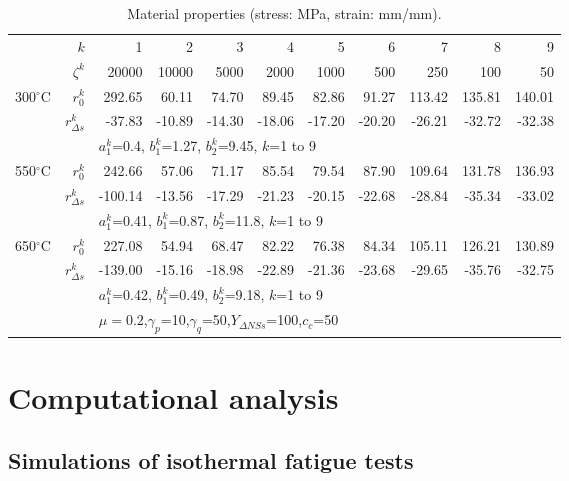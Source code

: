 \documentclass[preprint,5p,twocolumn,11pt,sort&compress]{elsarticle}
\begin{document}
\begin{table*}[htbp]
  \centering
  \caption{Material properties (stress: MPa, strain: mm/mm).}
    \begin{tabular}{rrrrrrrrrrr}
    \hline
          & $k$   & 1     & 2     & 3     & 4     & 5     & 6     & 7     & 8     & 9 \\
          & $\zeta^k$ & 20000 & 10000 & 5000  & 2000  & 1000  & 500   & 250   & 100   & 50 \\
    \hline
    300$^{\circ}$C & $r_0^k$ & 292.65  & 60.11  & 74.70  & 89.45  & 82.86  & 91.27  & 113.42  & 135.81  & 140.01  \\
          & $r_{\Delta s}^k$ & -37.83  & -10.89  & -14.30  & -18.06  & -17.20  & -20.20  & -26.21  & -32.72  & -32.38  \\
          & & \multicolumn{9}{l}{$a_1^k$=0.4, $b_1^k$=1.27, $b_2^k$=9.45, $k$=1 to 9} \\
    \hline
    550$^{\circ}$C & $r_0^k$ & 242.66  & 57.06  & 71.17  & 85.54  & 79.54  & 87.90  & 109.64  & 131.78  & 136.93  \\
          & $r_{\Delta s}^k$ & -100.14  & -13.56  & -17.29  & -21.23  & -20.15  & -22.68  & -28.84  & -35.34  & -33.02  \\
          & & \multicolumn{9}{l}{$a_1^k$=0.41, $b_1^k$=0.87, $b_2^k$=11.8, $k$=1 to 9} \\
    \hline
    650$^{\circ}$C & $r_0^k$ & 227.08  & 54.94  & 68.47  & 82.22  & 76.38  & 84.34  & 105.11  & 126.21  & 130.89  \\
          & $r_{\Delta s}^k$ & -139.00  & -15.16  & -18.98  & -22.89  & -21.36  & -23.68  & -29.65  & -35.76  & -32.75  \\
          & & \multicolumn{9}{l}{$a_1^k$=0.42, $b_1^k$=0.49, $b_2^k$=9.18, $k$=1 to 9} \\
    \hline
          & & \multicolumn{9}{l}{$\mu=0.2$,$\gamma_p$=10,$\gamma_q$=50,$Y_{\Delta NSs}$=100,$c_c$=50} \\
    \hline
    \end{tabular}%
  \label{tab:3}%
\end{table*}%

\section{Computational analysis}

\subsection{Simulations of isothermal fatigue tests}
\label{}
\end{document}
